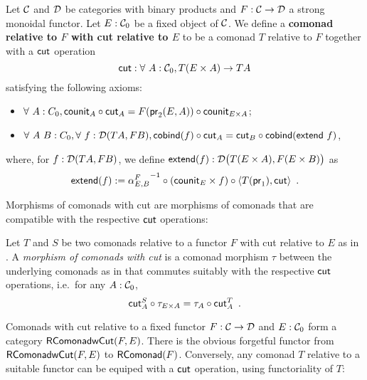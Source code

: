 \documentclass{amsart}
\newcommand{\fat}[1]{\textbf{#1}}
\begin{document}
\begin{definition}\label{def:rel_comonad_with_cut}
 Let $\C$ and $\D$ be categories with binary products and $F:\C\to\D$ a strong monoidal functor. Let $E:\C_0$ be a fixed object of $\C$.
 We define a \fat{comonad relative to $F$ with cut relative to $E$} to be a comonad $T$ relative to $F$ together with a $\cut$ operation 
    \[ \cut : \forall~A:\C_0, T(E\times A) \to TA \]
 satisfying the following axioms:
  \begin{itemize}
   \item $\forall~A:C_0, \comp{\cut_A}{\counit_A} = \comp{\counit_{E\times A}}{F(\pr_2(E,A))}$;
   \item $\forall~A~B:C_0,\forall~f:\D(TA,FB), \comp{\cut_A}{\cobind(f)} = \comp{\cobind(\extend~f)}{\cut_B}$,
  \end{itemize}

  \noindent
  where, for $f:\D(TA,FB)$, we define $\extend(f) : \D\bigl(T(E\times A),F(E\times B)\bigr)$ as
       \[ \extend(f) := \comp{\comp{\langle T(\pr_1) , \cut \rangle}{(\counit_E\times f)}}{{\alpha^{F}_{E,B}}^{-1}} \enspace . \]
  
\end{definition}

Morphisms of comonads with cut are morphisms of comonads that are compatible with the respective $\cut$ operations:

\begin{definition}\label{def:morphism_comonad_cut}
 Let $T$ and $S$ be two comonads relative to a functor $F$ with cut relative to $E$ as in .
 A \emph{morphism of comonads with cut} is a comonad morphism $\tau$ between the underlying comonads as in  that 
 commutes suitably with the respective $\cut$ operations, i.e.\ for any $A : \C_0$,
  \[ \comp{\tau_{E \times A}}{\cut^S_A}  = \comp{\cut^T_A}{\tau_A} \enspace . \]
\end{definition}


Comonads with cut relative to a fixed functor $F:\C\to\D$ and $E:\C_0$ form a category $\RComonadWC(F,E)$.
There is the obvious forgetful functor from $\RComonadWC(F,E)$ to $\RComonad(F)$.
Conversely, any comonad $T$ relative to a suitable functor can be equiped with a $\cut$ operation, using functoriality of $T$:

\end{document}
